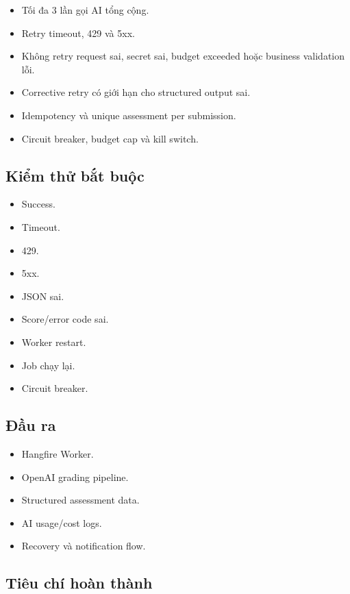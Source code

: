 \documentclass[
  11pt,
  a4paper,
]{article}
\begin{document}
\begin{itemize}
\item
  Tối đa 3 lần gọi AI tổng cộng.
\item
  Retry timeout, 429 và 5xx.
\item
  Không retry request sai, secret sai, budget exceeded hoặc business
  validation lỗi.
\item
  Corrective retry có giới hạn cho structured output sai.
\item
  Idempotency và unique assessment per submission.
\item
  Circuit breaker, budget cap và kill switch.
\end{itemize}

\subsection{Kiểm thử bắt
buộc}\label{kiux1ec3m-thux1eed-bux1eaft-buux1ed9c-4}

\begin{itemize}
\item
  Success.
\item
  Timeout.
\item
  429.
\item
  5xx.
\item
  JSON sai.
\item
  Score/error code sai.
\item
  Worker restart.
\item
  Job chạy lại.
\item
  Circuit breaker.
\end{itemize}

\subsection{Đầu ra}\label{ux111ux1ea7u-ra-6}

\begin{itemize}
\item
  Hangfire Worker.
\item
  OpenAI grading pipeline.
\item
  Structured assessment data.
\item
  AI usage/cost logs.
\item
  Recovery và notification flow.
\end{itemize}

\subsection{Tiêu chí hoàn
thành}\label{tiuxeau-chuxed-houxe0n-thuxe0nh-6}
\end{document}
